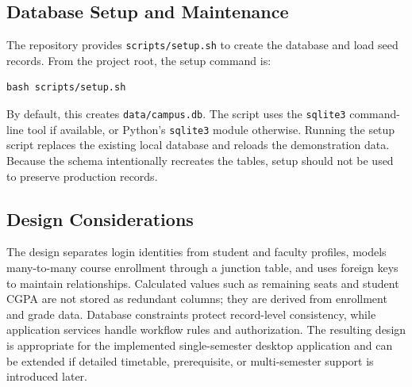 \subsection{Database Setup and Maintenance}
The repository provides \texttt{scripts/setup.sh} to create the database and load seed records. From the project root, the setup command is:
\begin{verbatim}
bash scripts/setup.sh
\end{verbatim}
By default, this creates \texttt{data/campus.db}. The script uses the \texttt{sqlite3} command-line tool if available, or Python's \texttt{sqlite3} module otherwise. Running the setup script replaces the existing local database and reloads the demonstration data. Because the schema intentionally recreates the tables, setup should not be used to preserve production records.

\subsection{Design Considerations}
The design separates login identities from student and faculty profiles, models many-to-many course enrollment through a junction table, and uses foreign keys to maintain relationships. Calculated values such as remaining seats and student CGPA are not stored as redundant columns; they are derived from enrollment and grade data. Database constraints protect record-level consistency, while application services handle workflow rules and authorization. The resulting design is appropriate for the implemented single-semester desktop application and can be extended if detailed timetable, prerequisite, or multi-semester support is introduced later.
